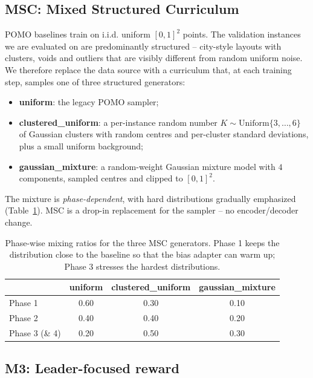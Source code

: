 \documentclass[11pt,a4paper]{article}
\begin{document}
\subsection{MSC: Mixed Structured Curriculum}
\label{sec:msc}

POMO baselines train on i.i.d. uniform $[0,1]^2$ points. The validation
instances we are evaluated on are predominantly structured -- city-style
layouts with clusters, voids and outliers that are visibly different from
random uniform noise. We therefore replace
the data source with a curriculum that, at each training step, samples one of
three structured generators:
%
\begin{itemize}
  \item \textbf{uniform}: the legacy POMO sampler;
  \item \textbf{clustered\_uniform}: a per-instance random number $K\sim
        \mathrm{Uniform}\{3,\dots,6\}$ of Gaussian clusters with random
        centres and per-cluster standard deviations, plus a small uniform
        background;
  \item \textbf{gaussian\_mixture}: a random-weight Gaussian mixture model
        with $4$ components, sampled centres and clipped to $[0,1]^2$.
\end{itemize}
%
The mixture is \emph{phase-dependent}, with hard distributions gradually
emphasized (Table~\ref{tab:msc-mix}). MSC is a drop-in replacement for the
sampler -- no encoder/decoder change.

\begin{table}[t]
\centering
\caption{Phase-wise mixing ratios for the three MSC generators. Phase 1
keeps the distribution close to the baseline so that the bias adapter can
warm up; Phase 3 stresses the hardest distributions.}
\label{tab:msc-mix}
\small
\begin{tabular}{l c c c}
\toprule
                 & uniform & clustered\_uniform & gaussian\_mixture \\
\midrule
Phase 1          & 0.60    & 0.30 & 0.10 \\
Phase 2          & 0.40    & 0.40 & 0.20 \\
Phase 3 (\& 4)   & 0.20    & 0.50 & 0.30 \\
\bottomrule
\end{tabular}
\end{table}

\subsection{M3: Leader-focused reward}
\label{sec:m3}
\end{document}
